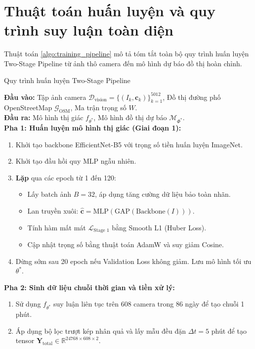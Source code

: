 \clearpage
\section{Thuật toán huấn luyện và quy trình suy luận toàn diện}
\label{sec:thuat_toan_huan_luyen}

Thuật toán \ref{algo:training_pipeline} mô tả tóm tắt toàn bộ quy trình huấn luyện Two-Stage Pipeline từ ảnh thô camera đến mô hình dự báo đồ thị hoàn chỉnh.

\begin{algorithm_box}{Quy trình huấn luyện Two-Stage Pipeline}{
\textbf{Đầu vào:} Tập ảnh camera $\mathcal{D}_{\text{vision}} = \{(I_k, \mathbf{c}_k)\}_{k=1}^{5012}$, Đồ thị đường phố OpenStreetMap $\mathcal{G}_{\text{OSM}}$, Ma trận trọng số $W$. \\
\textbf{Đầu ra:} Mô hình thị giác $f_{\theta^*}$, Mô hình đồ thị dự báo $\mathcal{M}_{\Phi^*}$. \\
\textbf{Pha 1: Huấn luyện mô hình thị giác (Giai đoạn 1):}
\begin{enumerate}
    \item Khởi tạo backbone EfficientNet-B5 với trọng số tiền huấn luyện ImageNet.
    \item Khởi tạo đầu hồi quy MLP ngẫu nhiên.
    \item \textbf{Lặp} qua các epoch từ 1 đến 120:
    \begin{itemize}
        \item Lấy batch ảnh $B=32$, áp dụng tăng cường dữ liệu bảo toàn nhãn.
        \item Lan truyền xuôi: $\hat{\mathbf{c}} = \text{MLP}(\text{GAP}(\text{Backbone}(I)))$.
        \item Tính hàm mất mát $\mathcal{L}_{\text{Stage 1}}$ bằng Smooth L1 (Huber Loss).
        \item Cập nhật trọng số bằng thuật toán AdamW và suy giảm Cosine.
    \end{itemize}
    \item Dừng sớm sau 20 epoch nếu Validation Loss không giảm. Lưu mô hình tối ưu $\theta^*$.
\end{enumerate}
\textbf{Pha 2: Sinh dữ liệu chuỗi thời gian và tiền xử lý:}
\begin{enumerate}
    \item Sử dụng $f_{\theta^*}$ suy luận liên tục trên 608 camera trong 86 ngày để tạo chuỗi 1 phút.
    \item Áp dụng bộ lọc trượt kép nhân quả và lấy mẫu đều đặn $\Delta t = 5$ phút để tạo tensor $\mathbf{Y}_{\text{total}} \in \mathbb{R}^{24768 \times 608 \times 2}$.

\end{enumerate}}
\end{algorithm_box}
